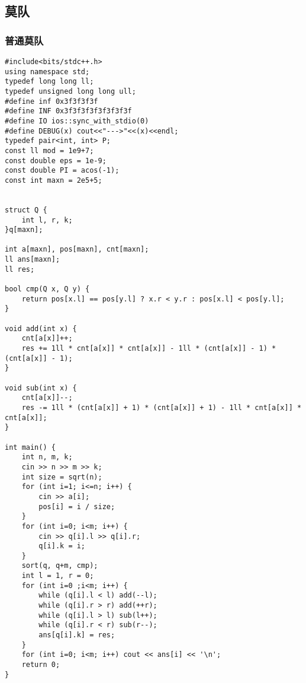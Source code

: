 \subsection{莫队}
\subsubsection{普通莫队}
\begin{lstlisting}
#include<bits/stdc++.h>
using namespace std;
typedef long long ll;
typedef unsigned long long ull;
#define inf 0x3f3f3f3f
#define INF 0x3f3f3f3f3f3f3f3f
#define IO ios::sync_with_stdio(0)
#define DEBUG(x) cout<<"--->"<<(x)<<endl;
typedef pair<int, int> P;
const ll mod = 1e9+7;
const double eps = 1e-9;
const double PI = acos(-1);
const int maxn = 2e5+5;


struct Q {
	int l, r, k;
}q[maxn];

int a[maxn], pos[maxn], cnt[maxn];
ll ans[maxn];
ll res;

bool cmp(Q x, Q y) {
	return pos[x.l] == pos[y.l] ? x.r < y.r : pos[x.l] < pos[y.l];
}

void add(int x) {
	cnt[a[x]]++;
	res += 1ll * cnt[a[x]] * cnt[a[x]] - 1ll * (cnt[a[x]] - 1) * (cnt[a[x]] - 1);
}

void sub(int x) {
	cnt[a[x]]--;
	res -= 1ll * (cnt[a[x]] + 1) * (cnt[a[x]] + 1) - 1ll * cnt[a[x]] * cnt[a[x]];
}

int main() {
	int n, m, k;
	cin >> n >> m >> k;
	int size = sqrt(n);
	for (int i=1; i<=n; i++) {
		cin >> a[i];
		pos[i] = i / size;
	}
	for (int i=0; i<m; i++) {
		cin >> q[i].l >> q[i].r;
		q[i].k = i;
	}
	sort(q, q+m, cmp);
	int l = 1, r = 0;
	for (int i=0 ;i<m; i++) {
		while (q[i].l < l) add(--l);
		while (q[i].r > r) add(++r);
		while (q[i].l > l) sub(l++);
		while (q[i].r < r) sub(r--);
		ans[q[i].k] = res;
	}
	for (int i=0; i<m; i++) cout << ans[i] << '\n';
	return 0;
}
\end{lstlisting}


